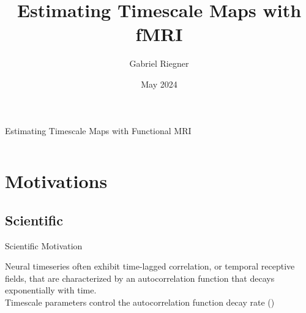 \documentclass[12pt]{beamer}
\title{Estimating Timescale Maps with fMRI}
\author[]{Gabriel Riegner}
\date{May 2024}
\begin{document}
\begin{frame}{Estimating Timescale Maps with Functional MRI}
\small
\begin{columns}
\tableofcontents[hideallsubsections]
\end{columns}
\end{frame}


\section{Motivations}

\subsection{Scientific}
\begin{frame}{Scientific Motivation}
\footnotesize

Neural timeseries often exhibit time-lagged correlation, or temporal receptive fields, that are characterized by an autocorrelation function that decays exponentially with time.\\
\vspace{.5cm}
Timescale parameters control the autocorrelation function decay rate (\cite{gao_neuronal_2020})

\end{frame}
\end{document}
